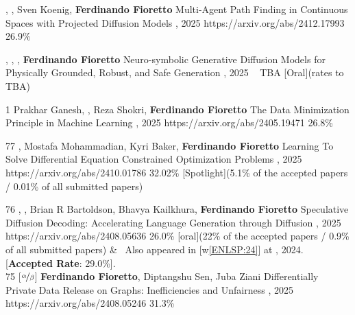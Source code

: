 \begin{pubs}
\confentry
	{} 
	{, , {Sven Koenig}, {\bf Ferdinando Fioretto}}
	{Multi-Agent Path Finding in Continuous Spaces with Projected Diffusion Models}
	{\procICML, 2025}
	{https://arxiv.org/abs/2412.17993}
	{26.9\%} %
	
\confentryAwd
	{} 
	{, , , {\bf Ferdinando Fioretto}}
	{Neuro-symbolic Generative Diffusion Models for Physically Grounded, Robust, and Safe Generation}
	{, 2025}
	{~}
	{TBA} %
	{[Oral]}{(rates to TBA)}
	
\confentry
	{1}
	{Prakhar Ganesh, , Reza Shokri, {\bf Ferdinando Fioretto}}
	{The Data Minimization Principle in Machine Learning}
	{\procFAccT, 2025}
	{https://arxiv.org/abs/2405.19471}
	{26.8\%} %

\confentryAwd
	{77}
	{, Mostafa Mohammadian, Kyri Baker, {\bf Ferdinando Fioretto}}
	{Learning To Solve Differential Equation Constrained Optimization Problems}
	{\procICLR, 2025}
	{https://arxiv.org/abs/2410.01786}
	{32.02\%} %
	{[Spotlight]}{(5.1\% of the accepted papers / 0.01\% of all submitted papers)}

\confentryAwd
	{76}
	{, , Brian R Bartoldson, Bhavya Kailkhura, {\bf Ferdinando Fioretto}}
	{Speculative Diffusion Decoding: Accelerating Language Generation through Diffusion}
	{\procNAACL, 2025}
	{https://arxiv.org/abs/2408.05636}
	{26.0\%}
	{[oral]}{(22\% of the accepted papers / 0.9\% of all submitted papers)}
&	\hspace{4pt} \faAngleRight\, Also appeared in [w\ref{ENLSP:24}] at , 2024.
	\hspace{4pt} {[{\bf Accepted Rate}: 29.0\%].}\\[0.5em]

\confentry
	{75}
	{[$\nicefrac{\alpha}{\beta}$] {\bf Ferdinando Fioretto}, Diptangshu Sen, Juba Ziani}
	{Differentially Private Data Release on Graphs: Inefficiencies and Unfairness}
	{\procAISTATS, 2025}
	{https://arxiv.org/abs/2408.05246}
	{31.3\%} %


\end{pubs}
